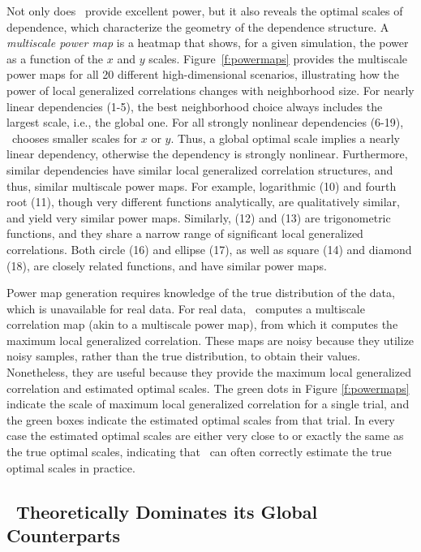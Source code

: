 \documentclass[11pt]{article}
\begin{document}
Not only does \Mgc~provide excellent power, but it also reveals the optimal scales of dependence, which characterize the geometry of the dependence structure. 
A \emph{multiscale power map} is a heatmap that shows, for a given simulation, the power as a function of the $x$ and $y$ scales.  
Figure~\ref{f:powermaps} provides the multiscale power maps for all 20 different high-dimensional scenarios, illustrating how the power of local generalized correlations changes with  neighborhood size.
For nearly linear dependencies (1-5), the best neighborhood choice always includes the largest scale, i.e., the global one. For all strongly nonlinear dependencies (6-19),  \Mgc~chooses smaller scales for $x$ or $y$. Thus, a global optimal scale implies a nearly linear dependency, otherwise the dependency is strongly nonlinear.
Furthermore, similar dependencies have similar local generalized correlation structures, and thus, similar multiscale power maps. For example, logarithmic (10) and fourth root (11), though very different functions analytically, are qualitatively similar, and yield very similar power maps.
Similarly,  (12) and (13) are trigonometric functions, and they share a narrow range of significant local generalized correlations.
Both circle (16) and ellipse (17), as well as square (14) and diamond (18), are closely related functions, and have similar  power maps. 

Power map generation requires knowledge of the true distribution of the data, which is unavailable for real data.
For real data, \Mgc~computes a multiscale correlation map (akin to a multiscale power map), from which it computes the maximum local generalized correlation.  These maps are noisy because they utilize noisy samples, rather than the true distribution, to obtain their values.  Nonetheless, they are useful because they provide the maximum local generalized correlation and estimated optimal scales.  The green dots in Figure \ref{f:powermaps} indicate the scale of maximum local generalized correlation for a single trial, and the green boxes indicate the estimated optimal scales from that trial.  In every case the estimated optimal scales are either very close to or exactly the same as the true optimal scales, indicating that \Mgc~can often correctly estimate the true optimal scales in practice.





\subsection*{\Mgc~Theoretically Dominates its Global Counterparts}
\label{s:theory}
\end{document}
